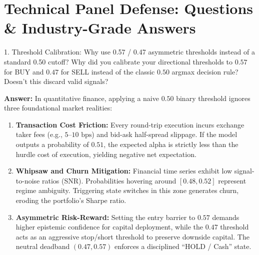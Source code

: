 \documentclass[11pt,a4paper]{article}
\begin{document}
\section{Technical Panel Defense: Questions \& Industry-Grade Answers}

\begin{questionbox}{1. Threshold Calibration: Why use 0.57 / 0.47 asymmetric thresholds instead of a standard 0.50 cutoff?}
Why did you calibrate your directional thresholds to $0.57$ for BUY and $0.47$ for SELL instead of the classic $0.50$ argmax decision rule? Doesn't this discard valid signals?
\end{questionbox}
\begin{answerbox}
\textbf{Answer:} In quantitative finance, applying a naive $0.50$ binary threshold ignores three foundational market realities:
\begin{enumerate}[leftmargin=1.5em]
  \item \textbf{Transaction Cost Friction:} Every round-trip execution incurs exchange taker fees (e.g., $5\text{--}10\text{ bps}$) and bid-ask half-spread slippage. If the model outputs a probability of $0.51$, the expected alpha is strictly less than the hurdle cost of execution, yielding negative net expectation.
  \item \textbf{Whipsaw and Churn Mitigation:} Financial time series exhibit low signal-to-noise ratios (SNR). Probabilities hovering around $[0.48, 0.52]$ represent regime ambiguity. Triggering state switches in this zone generates churn, eroding the portfolio's Sharpe ratio.
  \item \textbf{Asymmetric Risk-Reward:} Setting the entry barrier to $0.57$ demands higher epistemic confidence for capital deployment, while the $0.47$ threshold acts as an aggressive stop/short threshold to preserve downside capital. The neutral deadband $(0.47, 0.57)$ enforces a disciplined ``HOLD / Cash'' state.
\end{enumerate}
\end{answerbox}

\vspace{0.4em}
\end{document}
